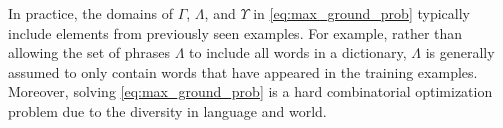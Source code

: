 

In practice, the domains of $\Gamma$, $\Lambda$, and $\Upsilon$ in \eqref{eq:max_ground_prob} typically include elements from previously seen examples. %
For example, rather than allowing the set of phrases $\Lambda$ to include all words in a dictionary, $\Lambda$ is generally assumed to only contain words that have appeared in the training examples. Moreover, solving \eqref{eq:max_ground_prob} is a hard combinatorial optimization problem due to the diversity in language and world.

